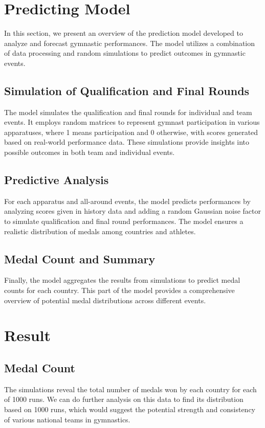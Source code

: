 \documentclass{article}
\theoremstyle{roman}
\begin{document}
\section{Predicting Model}
In this section, we present an overview of the prediction model developed to analyze and forecast gymnastic performances. The model utilizes a combination of data processing and random simulations to predict outcomes in gymnastic events.

\subsection{Simulation of Qualification and Final Rounds}
The model simulates the qualification and final rounds for individual and team events. It employs random matrices to represent gymnast participation in various apparatuses, where 1 means participation and 0 otherwise, with scores generated based on real-world performance data. These simulations provide insights into possible outcomes in both team and individual events.

\subsection{Predictive Analysis}
For each apparatus and all-around events, the model predicts performances by analyzing scores given in history data and adding a random Gaussian noise factor to simulate qualification and final round performances. The model ensures a realistic distribution of medals among countries and athletes.

\subsection{Medal Count and Summary}
Finally, the model aggregates the results from simulations to predict medal counts for each country. This part of the model provides a comprehensive overview of potential medal distributions across different events.

\section{Result}
\subsection{Medal Count} The simulations reveal the total number of medals won by each country for each of 1000 runs. We can do further analysis on this data to find its distribution based on 1000 runs, which would suggest the potential strength and consistency of various national teams in gymnastics.
\end{document}
